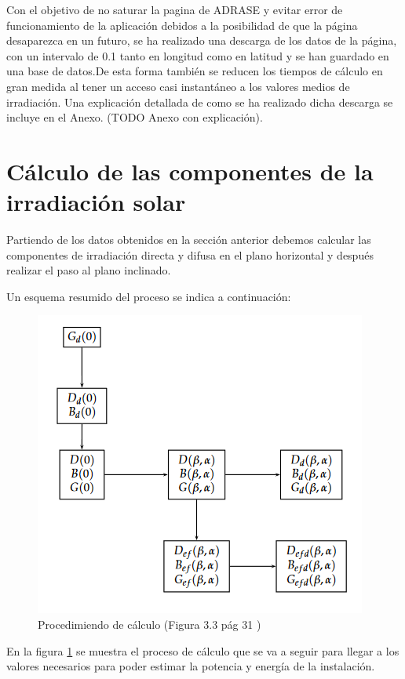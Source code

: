 \documentclass[11pt]{report}
\begin{document}
Con el objetivo de no saturar la pagina de ADRASE y evitar error de funcionamiento de la aplicación debidos a la posibilidad de que la página desaparezca en un futuro, se ha realizado una descarga de los datos de la página, con un intervalo de 0.1 tanto en longitud como en latitud y se han guardado en una base de datos.De esta forma también se reducen los tiempos de cálculo en gran medida al tener un acceso casi instantáneo a los valores medios de irradiación. 
Una explicación detallada de como se ha realizado dicha descarga se incluye en el Anexo. (TODO Anexo con explicación).
\newpage

\section{Cálculo de las componentes de la irradiación solar}

Partiendo de los datos obtenidos en la sección anterior debemos calcular las componentes de irradiación directa y difusa en el plano horizontal y después realizar el paso al plano inclinado.

Un esquema resumido del proceso se indica a continuación:

\begin{figure}[ht]
\includegraphics[scale=0.7]{32_ESFBOOK_1}
\centering
\caption{Procedimiendo de cálculo (Figura 3.3 pág 31 \cite{esf_book})}
\label{fig:fig_1}
\end{figure}

En la figura \ref{fig:fig_1} se muestra el proceso de cálculo que se va a seguir para llegar a los valores necesarios para poder estimar la potencia y energía de la instalación.
\end{document}

